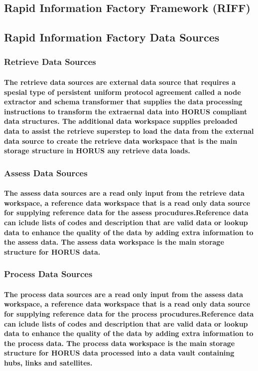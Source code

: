 \subsection{Rapid Information Factory Framework (RIFF)}

\subsection{Rapid Information Factory Data Sources}
\subsubsection{Retrieve Data Sources}
\paragraph{The retrieve data sources are external data source that requires a spesial type of persistent uniform protocol agreement called a node extractor and schema transformer that supplies the data processing instructions to transform the extraernal data into HORUS compliant data structures. The additional data workspace supplies preloaded data to assist the retrieve superstep to load the data from the external data source to create the retrieve data workspace that is the main storage structure in HORUS any retrieve data loads.}
\subsubsection{Assess Data Sources}
\paragraph{The assess data sources are a read only input from the retrieve data workspace, a reference data workspace that is a read only data source for supplying reference data for the assess procudures.Reference data can iclude lists of codes and description that are valid data or lookup data to enhance the quality of the data by adding extra information to the assess data. The assess data workspace is the main storage structure for HORUS data.}
\subsubsection{Process Data Sources}
\paragraph{The process data sources are a read only input from the assess data workspace, a reference data workspace that is a read only data source for supplying reference data for the process procudures.Reference data can iclude lists of codes and description that are valid data or lookup data to enhance the quality of the data by adding extra information to the process data. The process data workspace is the main storage structure for HORUS data processed into a data vault containing hubs, links and satellites. }
